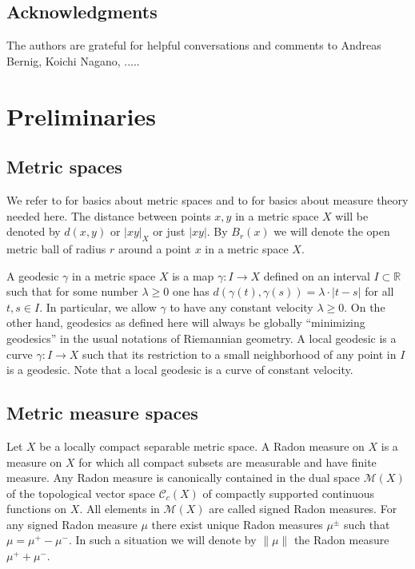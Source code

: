 \documentclass[12pt,leqno]{amsart}
\numberwithin{equation}{section}
\theoremstyle{definition}
\theoremstyle{remark}
\newcommand{\R}{\mathbb{R}}
\def\:{\colon}
\begin{document}
\subsection{Acknowledgments}  The authors are grateful for helpful conversations and comments to Andreas Bernig, Koichi Nagano,  ..... 


\section{Preliminaries}
\subsection{Metric spaces}
We refer to \cite{BBI01} for basics about metric spaces and to \cite{Federer} for basics about measure theory needed here.
The distance between points $x,y$ in a metric space $X$ will be denoted by $d(x,y)$ or $|xy|_X$ or just $|xy|$.
By $B_r(x)$ we will denote the open metric ball of radius $r$ around a point $x$ in a metric space $X$.


A geodesic $\gamma$ in a metric space $X$ is  a map $\gamma \:I\to X$ defined on an interval $I \subset \R$ such that for some number $\lambda \geq 0$ one has
$d(\gamma (t),\gamma (s)) =\lambda \cdot |t-s|$ for all $t,s\in I$. In particular, we allow $\gamma$ to have any constant velocity $\lambda \geq 0$. On the other hand, geodesics
as defined here will always be globally ``minimizing geodesics'' in the usual notations of Riemannian geometry.
A local geodesic is a curve $\gamma\: I\to X$ such that its restriction to a small neighborhood of any point in $I$ is  a geodesic. Note that a local geodesic is a curve of constant velocity.

\subsection{Metric measure spaces}
Let $X$ be a locally compact separable metric space. A Radon measure on $X$ is a measure on $X$ for which all compact subsets are measurable and have finite measure.
Any Radon measure is canonically contained in the dual space $\mathcal M(X)$ of the topological vector space $\mathcal C_c (X)$ of compactly supported continuous functions on $X$.
All elements in $\mathcal M(X)$ are called signed Radon measures. For any signed Radon measure $\mu$ there exist unique Radon measures $\mu ^{\pm}$ such that $\mu =\mu ^+- \mu ^-$.
In such a situation we will denote by $\|\mu\|$ the Radon measure $\mu ^+ +\mu ^-$.
\end{document}
